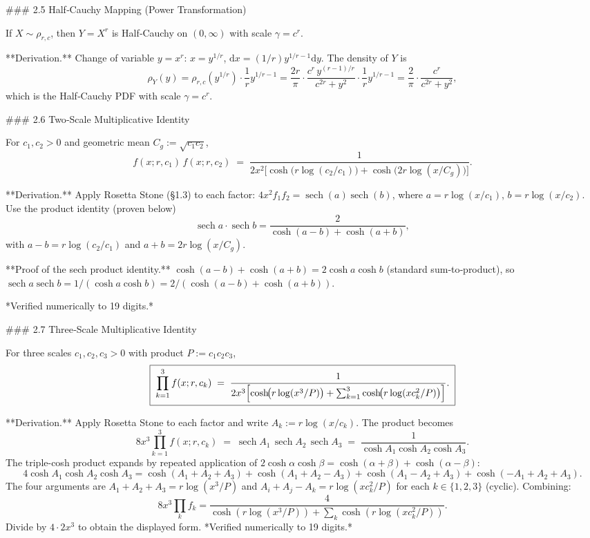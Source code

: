 ### 2.5 Half‑Cauchy Mapping (Power Transformation)

If $X\sim\rho_{r,c}$, then $Y=X^{r}$ is Half‑Cauchy on $(0,\infty)$ with scale $\gamma = c^{r}$.

**Derivation.** Change of variable $y = x^{r}$: $x = y^{1/r}$, $\mathrm dx = (1/r)y^{1/r-1}\mathrm dy$. The density of $Y$ is
$$
\rho_{Y}(y) = \rho_{r,c}(y^{1/r})\cdot\frac{1}{r}y^{1/r-1} = \frac{2r}{\pi}\cdot\frac{c^{r}\,y^{(r-1)/r}}{c^{2r}+y^{2}}\cdot\frac{1}{r}y^{1/r-1} = \frac{2}{\pi}\cdot\frac{c^{r}}{c^{2r}+y^{2}},
$$
which is the Half‑Cauchy PDF with scale $\gamma=c^{r}$.

### 2.6 Two‑Scale Multiplicative Identity

For $c_{1},c_{2}>0$ and geometric mean $C_{g}:=\sqrt{c_{1}c_{2}}$,
$$
\boxed{\;f(x;r,c_{1})\,f(x;r,c_{2}) \;=\; \frac{1}{2x^{2}\bigl[\cosh\!\bigl(r\log(c_{2}/c_{1})\bigr)+\cosh\!\bigl(2r\log(x/C_{g})\bigr)\bigr]}.\;}
$$

**Derivation.** Apply Rosetta Stone (§1.3) to each factor: $4x^{2}f_{1}f_{2} = \operatorname{sech}(a)\operatorname{sech}(b)$, where $a = r\log(x/c_{1})$, $b = r\log(x/c_{2})$. Use the product identity (proven below)
$$
\operatorname{sech} a\cdot\operatorname{sech} b = \frac{2}{\cosh(a-b)+\cosh(a+b)},
$$
with $a-b = r\log(c_{2}/c_{1})$ and $a+b = 2r\log(x/C_{g})$.

**Proof of the sech product identity.** $\cosh(a-b)+\cosh(a+b) = 2\cosh a\cosh b$ (standard sum‑to‑product), so $\operatorname{sech} a\operatorname{sech} b = 1/(\cosh a\cosh b) = 2/(\cosh(a-b)+\cosh(a+b))$.

*Verified numerically to 19 digits.*

### 2.7 Three‑Scale Multiplicative Identity

For three scales $c_{1},c_{2},c_{3}>0$ with product $P:=c_{1}c_{2}c_{3}$,
$$
\boxed{\;\prod_{k=1}^{3}f(x;r,c_{k}) \;=\; \frac{1}{2x^{3}\Bigl[\cosh\!\bigl(r\log(x^{3}/P)\bigr) + \sum_{k=1}^{3}\cosh\!\bigl(r\log(xc_{k}^{2}/P)\bigr)\Bigr]}.\;}
$$

**Derivation.** Apply Rosetta Stone to each factor and write $A_{k}:=r\log(x/c_{k})$. The product becomes
$$
8x^{3}\prod_{k=1}^{3}f(x;r,c_{k}) \;=\; \operatorname{sech} A_{1}\,\operatorname{sech} A_{2}\,\operatorname{sech} A_{3} \;=\; \frac{1}{\cosh A_{1}\cosh A_{2}\cosh A_{3}}.
$$
The triple-cosh product expands by repeated application of $2\cosh\alpha\cosh\beta = \cosh(\alpha+\beta)+\cosh(\alpha-\beta)$:
$$
4\cosh A_{1}\cosh A_{2}\cosh A_{3} = \cosh(A_{1}+A_{2}+A_{3}) + \cosh(A_{1}+A_{2}-A_{3}) + \cosh(A_{1}-A_{2}+A_{3}) + \cosh(-A_{1}+A_{2}+A_{3}).
$$
The four arguments are $A_{1}+A_{2}+A_{3} = r\log(x^{3}/P)$ and $A_{i}+A_{j}-A_{k} = r\log(xc_{k}^{2}/P)$ for each $k\in\{1,2,3\}$ (cyclic). Combining:
$$
8x^{3}\prod_{k}f_{k} = \frac{4}{\cosh(r\log(x^{3}/P)) + \sum_{k}\cosh(r\log(xc_{k}^{2}/P))}.
$$
Divide by $4\cdot 2x^{3}$ to obtain the displayed form. *Verified numerically to 19 digits.*

